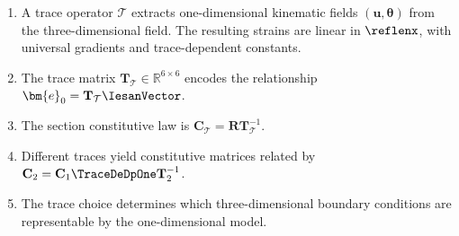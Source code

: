 \begin{enumerate}
\item A trace operator $\mathcal{T}$ extracts one-dimensional kinematic fields 
$(\bm{u}, \bm{\theta})$ from the three-dimensional field. 
The resulting strains  are linear in $\reflenx$, with universal gradients and trace-dependent constants.

\item The trace matrix $\mathbf{T}_{\mathcal{T}} \in \mathbb{R}^{6\times 6}$ 
encodes the relationship $\bm{e}_0 = \mathbf{T}_{\mathcal{T}} \IesanVector$.

\item The section constitutive law is $\mathbf{C}_{\mathcal{T}} = \mathbf{R} \mathbf{T}_{\mathcal{T}}^{-1}$.

\item Different traces yield constitutive matrices related by 
$\mathbf{C}_2 = \mathbf{C}_1 \TraceDeDpOne \mathbf{T}_2^{-1}$.

\item The trace choice determines which three-dimensional boundary conditions 
are representable by the one-dimensional model.
\end{enumerate}
